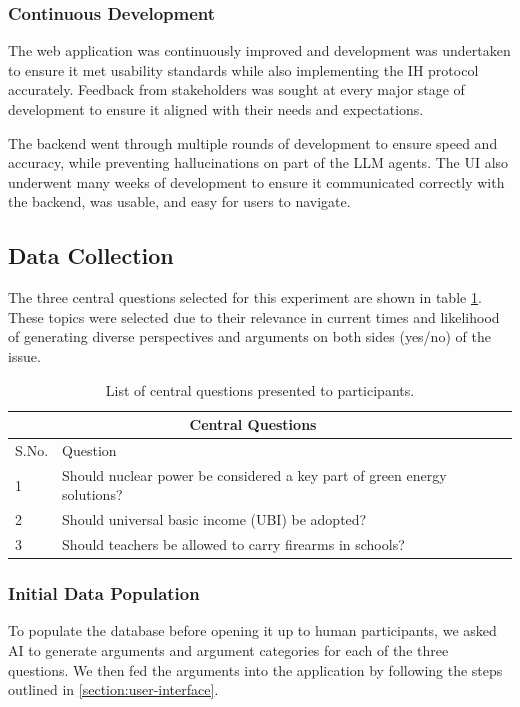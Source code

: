 \documentclass{scrartcl}
\begin{document}
\subsubsection{Continuous Development}
\label{section:continuous-development}
The web application was continuously improved and development was undertaken to ensure it met usability standards while also implementing the IH protocol accurately. Feedback from stakeholders was sought at every major stage of development to ensure it aligned with their needs and expectations.

The backend went through multiple rounds of development to ensure speed and accuracy, while preventing hallucinations on part of the LLM agents. The UI also underwent many weeks of development to ensure it communicated correctly with the backend, was usable, and easy for users to navigate.

\subsection{Data Collection}
\label{section:data-collection}
The three central questions selected for this experiment are shown in table \ref{tab:central_questions}. These topics were selected due to their relevance in current times and likelihood of generating diverse perspectives and arguments on both sides (yes/no) of the issue.

\begin{table}[ht]
    \centering
    \begin{tabular}{llr}
\hline
\multicolumn{2}{c}{\textbf{Central Questions}} \\
\hline
S.No.    & Question \\
\hline
1        & Should nuclear power be considered a key part of green energy solutions?\\
2        & Should universal basic income (UBI) be adopted?            \\
3        & Should teachers be allowed to carry firearms in schools?             \\
\hline
\end{tabular}
    \caption{List of central questions presented to participants.}
    \label{tab:central_questions}
\end{table}

\subsubsection{Initial Data Population}
\label{section:initial-data-population}
To populate the database before opening it up to human participants, we asked AI to generate arguments and argument categories for each of the three questions. We then fed the arguments into the application by following the steps outlined in \ref{section:user-interface}.
\end{document}
